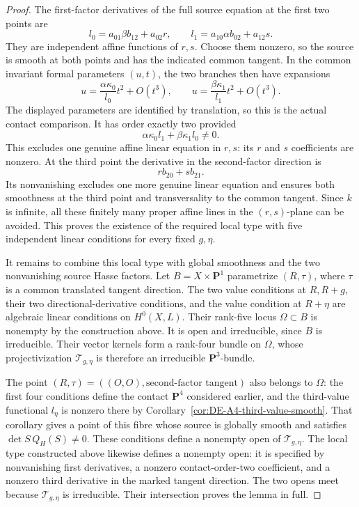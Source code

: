 \begin{proof}
The first-factor derivatives of the full source equation at the
first two points are
\[
        l_0=a_{01}\beta b_{12}+a_{02}r,\qquad
        l_1=a_{10}\alpha b_{02}+a_{12}s.
\]
They are independent affine functions of $r,s$.
Choose them nonzero, so the source is smooth at both points and
has the indicated common tangent.
In the common invariant formal parameters $(u,t)$, the two
branches then have expansions
\[
       u=\frac{\alpha\kappa_0}{l_0}t^2+O(t^3),
       \qquad
       u=\frac{\beta\kappa_1}{l_1}t^2+O(t^3).
\]
The displayed parameters are identified by translation, so this is
the actual contact comparison.  It has order exactly two provided
\[
                  \alpha\kappa_0l_1+\beta\kappa_1l_0\ne0.
\]
This excludes one genuine affine linear equation in $r,s$:
its $r$ and $s$ coefficients are nonzero.
At the third point the derivative in the second-factor direction is
\[
                               rb_{20}+sb_{21}.
\]
Its nonvanishing excludes one more genuine linear equation and
ensures both smoothness at the third point and transversality to
the common tangent.  Since $k$ is infinite, all these finitely
many proper affine lines in the $(r,s)$-plane can be avoided.
This proves the existence of the required local type with five
independent linear conditions for every fixed $g,\eta$.

It remains to combine this local type with global smoothness and
the two nonvanishing source Hasse factors.  Let
$B=X\times\mathbf P^1$ parametrize $(R,\tau)$, where $\tau$ is
a common translated tangent direction.  The two value conditions
at $R,R+g$, their two directional-derivative conditions, and the
value condition at $R+\eta$ are algebraic linear conditions on
$H^0(X,L)$.  Their rank-five locus $\Omega\subset B$ is nonempty
by the construction above.  It is open and irreducible, since
$B$ is irreducible.  Their vector kernels form a rank-four bundle
on $\Omega$, whose projectivization $\mathcal T_{g,\eta}$ is therefore
an irreducible $\mathbf P^3$-bundle.

The point $(R,\tau)=((O,O),\text{second-factor tangent})$ also
belongs to $\Omega$: the first four conditions define the contact
$\mathbf P^4$ considered earlier, and the third-value functional
$l_\eta$ is nonzero there by
Corollary~\ref{cor:DE-A4-third-value-smooth}.
That corollary gives a point of this fibre whose source is globally
smooth and satisfies $\det S\,Q_H(S)\ne0$.
These conditions define a nonempty open of $\mathcal T_{g,\eta}$.
The local type constructed above likewise defines a nonempty open:
it is specified by nonvanishing first derivatives, a nonzero
contact-order-two coefficient, and a nonzero third derivative
in the marked tangent direction.
The two opens meet because $\mathcal T_{g,\eta}$ is irreducible.
Their intersection proves the lemma in full.
\end{proof}

